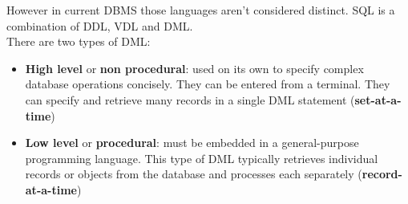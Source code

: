 However in current DBMS those languages aren't considered distinct. SQL is a combination of DDL, VDL and DML.\\

There are two types of DML:\\

\begin{itemize}
    \item \textbf{High level} or \textbf{non procedural}: used on its own to specify complex database operations concisely. They can be entered from a terminal. They can specify and retrieve many records in a single DML statement (\textbf{set-at-a-time})
    \item \textbf{Low level} or \textbf{procedural}: must be embedded in a general-purpose programming language. This type of DML typically retrieves individual records or objects from the database and processes each separately (\textbf{record-at-a-time})
\end{itemize}
